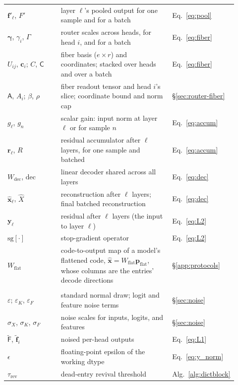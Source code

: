 \begin{longtable}{@{}>{\raggedright\arraybackslash}p{0.25\linewidth}%
>{\raggedright\arraybackslash}p{0.52\linewidth}%
>{\raggedright\arraybackslash}p{0.15\linewidth}@{}}
$\mathbf{f}'_\ell$, $F'$ & layer $\ell$'s pooled output for one sample and for a batch & Eq.~\eqref{eq:pool} \\
$\boldsymbol{\gamma}$, $\gamma_i$, $\Gamma$ & router scales across heads, for head $i$, and for a batch & Eq.~\eqref{eq:fiber} \\
$U_{ij}$, $\mathbf{c}_i$; $C$, $\mathsf{C}$ & fiber basis ($e\times r$) and coordinates; stacked over heads and over a batch & Eq.~\eqref{eq:fiber} \\
$\mathsf{A}$, $A_i$; $\beta$, $\rho$ & fiber readout tensor and head $i$'s slice; coordinate bound and norm cap & §\ref{sec:router-fiber} \\
$g_\ell$, $g_n$ & scalar gain: input norm at layer $\ell$ or for sample $n$ & Eq.~\eqref{eq:accum} \\
$\mathbf{r}_\ell$, $R$ & residual accumulator after $\ell$ layers, for one sample and batched & Eq.~\eqref{eq:accum} \\
$W_{\mathrm{dec}}$, $\mathrm{dec}$ & linear decoder shared across all layers & Eq.~\eqref{eq:dec} \\
$\hat{\mathbf{x}}_\ell$, $\hat{X}$ & reconstruction after $\ell$ layers; final batched reconstruction & Eq.~\eqref{eq:dec} \\
$\mathbf{y}_\ell$ & residual after $\ell$ layers (the input to layer $\ell$) & Eq.~\eqref{eq:L2} \\
$\mathrm{sg}[\cdot]$ & stop-gradient operator & Eq.~\eqref{eq:L2} \\
$W_{\mathrm{flat}}$ & code-to-output map of a model's flattened code, $\hat{\mathbf{x}} = W_{\mathrm{flat}}\mathbf{p}_{\mathrm{flat}}$, whose columns are the entries' decode directions & §\ref{app:protocols} \\
\addlinespace
\multicolumn{3}{@{}l}{\emph{Noise, statistics, and loss}} \\[2pt]
$\varepsilon$; $\varepsilon_K$, $\varepsilon_F$ & standard normal draw; logit and feature noise terms & §\ref{sec:noise} \\
$\sigma_X$, $\sigma_K$, $\sigma_F$ & noise scales for inputs, logits, and features & §\ref{sec:noise} \\
$\tilde{\mathsf{F}}$, $\tilde{\mathbf{f}}_i$ & noised per-head outputs & Eq.~\eqref{eq:L1} \\
$\epsilon$ & floating-point epsilon of the working dtype & Eq.~\eqref{eq:y_norm} \\
$\tau_{\mathrm{rev}}$ & dead-entry revival threshold & Alg.~\ref{alg:dictblock} \\

\end{longtable}
